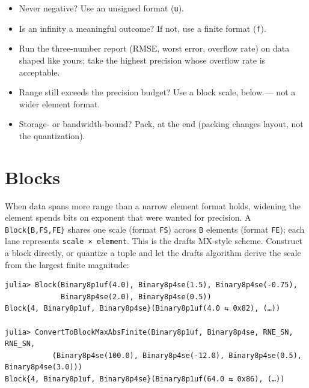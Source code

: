 \begin{itemize}
\item[1. ] Never negative? Use an unsigned format (\texttt{u}).


\item[2. ] Is an infinity a meaningful outcome? If not, use a finite format (\texttt{f}).


\item[3. ] Run the three-number report (RMSE, worst error, overflow rate) on data shaped like yours; take the highest precision whose overflow rate is acceptable.


\item[4. ] Range still exceeds the precision budget? Use a block scale, below — not a wider element format.


\item[5. ] Storage- or bandwidth-bound? Pack, at the end (packing changes layout, not the quantization).

\end{itemize}


\section{Blocks}



\label{13626648213057379036}{}


When data spans more range than a narrow element format holds, widening the element spends bits on exponent that were wanted for precision. A \texttt{Block\{B,FS,FE\}} shares one scale (format \texttt{FS}) across \texttt{B} elements (format \texttt{FE}); each lane represents \texttt{scale × element}. This is the draft{\textquotesingle}s MX-style scheme. Construct a block directly, or quantize a tuple and let the draft{\textquotesingle}s algorithm derive the scale from the largest finite magnitude:




\nopagebreak[4]
\begin{verbatim}
julia> Block(Binary8p1uf(4.0), Binary8p4se(1.5), Binary8p4se(-0.75),
             Binary8p4se(2.0), Binary8p4se(0.5))
Block{4, Binary8p1uf, Binary8p4se}(Binary8p1uf(4.0 ⇆ 0x82), (…))

julia> ConvertToBlockMaxAbsFinite(Binary8p1uf, Binary8p4se, RNE_SN, RNE_SN,
           (Binary8p4se(100.0), Binary8p4se(-12.0), Binary8p4se(0.5), Binary8p4se(3.0)))
Block{4, Binary8p1uf, Binary8p4se}(Binary8p1uf(64.0 ⇆ 0x86), (…))
\end{verbatim}



